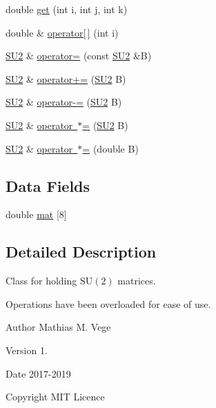 \begin{DoxyCompactItemize}
double \mbox{\hyperlink{class_s_u2_a4f10c4617e00686b196653dd669e0697}{get}} (int i, int j, int k)
\item 
double \& \mbox{\hyperlink{class_s_u2_aa8dbfcb283189ab089c0b73007e08e7e}{operator\mbox{[}$\,$\mbox{]}}} (int i)
\item 
\mbox{\hyperlink{class_s_u2}{S\+U2}} \& \mbox{\hyperlink{class_s_u2_a6b3df2e42e824e6a5f9d312e16132aa2}{operator=}} (const \mbox{\hyperlink{class_s_u2}{S\+U2}} \&B)
\item 
\mbox{\hyperlink{class_s_u2}{S\+U2}} \& \mbox{\hyperlink{class_s_u2_a36436ebbcc798eca5a5b1927038517c4}{operator+=}} (\mbox{\hyperlink{class_s_u2}{S\+U2}} B)
\item 
\mbox{\hyperlink{class_s_u2}{S\+U2}} \& \mbox{\hyperlink{class_s_u2_af1d50a5dec3c4dc888109e688bb9ec88}{operator-\/=}} (\mbox{\hyperlink{class_s_u2}{S\+U2}} B)
\item 
\mbox{\hyperlink{class_s_u2}{S\+U2}} \& \mbox{\hyperlink{class_s_u2_abf6e0365b7e284dfbf5a5ad228aadacd}{operator $\ast$=}} (\mbox{\hyperlink{class_s_u2}{S\+U2}} B)
\item 
\mbox{\hyperlink{class_s_u2}{S\+U2}} \& \mbox{\hyperlink{class_s_u2_a592fd0456666ba1e70abc4b31f9623b0}{operator $\ast$=}} (double B)
\end{DoxyCompactItemize}
\subsection*{Data Fields}
\begin{DoxyCompactItemize}
\item 
double \mbox{\hyperlink{class_s_u2_ad4227484be245b63489c44a2bc02a625}{mat}} \mbox{[}8\mbox{]}
\end{DoxyCompactItemize}


\subsection{Detailed Description}
Class for holding $\mathrm{SU}(2)$ matrices. 

Operations have been overloaded for ease of use.

\begin{DoxyAuthor}{Author}
Mathias M. Vege 
\end{DoxyAuthor}
\begin{DoxyVersion}{Version}
1. 
\end{DoxyVersion}
\begin{DoxyDate}{Date}
2017-\/2019 
\end{DoxyDate}
\begin{DoxyCopyright}{Copyright}
M\+IT Licence 
\end{DoxyCopyright}


